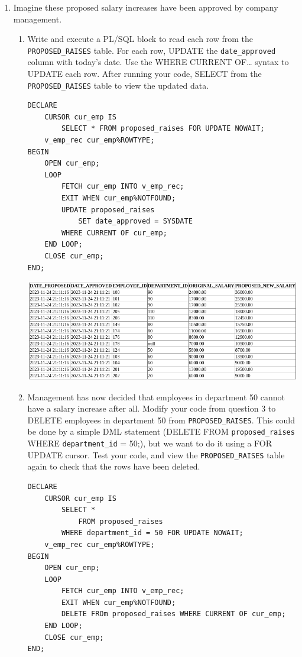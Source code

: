 \documentclass[11pt]{article}
\begin{document}
\begin{enumerate}
\item Imagine these proposed salary increases have been approved by company management.
\begin{enumerate}
\item Write and execute a PL/SQL block to read each row from the \texttt{PROPOSED\_RAISES} table. For each row, UPDATE the \texttt{date\_approved} column with today’s date. Use the WHERE CURRENT OF\ldots{} syntax to UPDATE each row. After running your code, SELECT from the \texttt{PROPOSED\_RAISES} table to view the updated data.
\begin{verbatim}
DECLARE
    CURSOR cur_emp IS
        SELECT * FROM proposed_raises FOR UPDATE NOWAIT;
    v_emp_rec cur_emp%ROWTYPE;
BEGIN
    OPEN cur_emp;
    LOOP
        FETCH cur_emp INTO v_emp_rec;
        EXIT WHEN cur_emp%NOTFOUND;
        UPDATE proposed_raises
            SET date_approved = SYSDATE
        WHERE CURRENT OF cur_emp;
    END LOOP;
    CLOSE cur_emp;
END;
\end{verbatim}

\begin{center}
\includegraphics[width=.9\linewidth]{./resources/prop_sal_tab2.png}
\end{center}

\item Management has now decided that employees in department 50 cannot have a salary increase after all. Modify your code from question 3 to DELETE employees in department 50 from \texttt{PROPOSED\_RAISES}. This could be done by a simple DML statement (DELETE FROM \texttt{proposed\_raises} WHERE \texttt{department\_id} = 50;), but we want to do it using a FOR UPDATE cursor. Test your code, and view the \texttt{PROPOSED\_RAISES} table again to check that the rows have been deleted.
\begin{verbatim}
DECLARE
    CURSOR cur_emp IS
        SELECT *
            FROM proposed_raises
        WHERE department_id = 50 FOR UPDATE NOWAIT;
    v_emp_rec cur_emp%ROWTYPE;
BEGIN
    OPEN cur_emp;
    LOOP
        FETCH cur_emp INTO v_emp_rec;
        EXIT WHEN cur_emp%NOTFOUND;
        DELETE FROm proposed_raises WHERE CURRENT OF cur_emp;
    END LOOP;
    CLOSE cur_emp;
END;
\end{verbatim}
\end{enumerate}
\end{enumerate}
\end{document}
